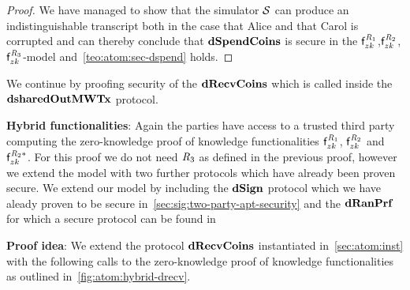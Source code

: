 \begin{proof}
    We have managed to show that the simulator $\mathcal{S}$ can produce an indistinguishable transcript both in the case that Alice and that Carol is corrupted and can thereby conclude that $\mathbf{dSpendCoins}$ is secure in the $\mathsf{f}^{\mathit{R}_1}_{zk}$,$\mathsf{f}^{\mathit{R}_2}_{zk}$,$\mathsf{f}^{\mathit{R}_3}_{zk}$-model and~\cref{teo:atom:sec-dspend} holds.
\end{proof}

We continue by proofing security of the $\mathbf{dRecvCoins}$ which is called inside the \\$\mathbf{dsharedOutMWTx}$ protocol.

\textbf{Hybrid functionalities}: Again the parties have access to a trusted third party computing the zero-knowledge proof of knowledge functionalities $\mathsf{f}^{\mathit{R}_1}_{zk}$, $\mathsf{f}^{\mathit{R}_2}_{zk}$ and $\mathsf{f}^{\mathit{R}_2*}_{zk}$.
For this proof we do not need $\mathit{R}_3$ as defined in the previous proof, however we extend the model with two further protocols which have already been proven secure.
We extend our model by including the $\mathbf{dSign}$ protocol which we have aleady proven to be secure in~\cref{sec:sig:two-party-apt-security} and the $\mathbf{dRanPrf}$ for which a secure protocol can be found in~\cite{klinec2020privacy}

\textbf{Proof idea}: We extend the protocol $\mathbf{dRecvCoins}$ instantiated in~\cref{sec:atom:inst} with the following calls to the zero-knowledge proof of knowledge functionalities as outlined in~\cref{fig:atom:hybrid-drecv}.

